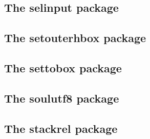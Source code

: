 \documentclass[a4paper,12pt]{article}
\makeatletter
\newcommand*{\xpackage}[1]{\textsf{#1}}
\newcommand*{\xfile}[1]{\texttt{#1}}
\newcommand*{\cs}[1]{\texttt{\textbackslash#1}}
\newcommand*{\tocinclude}[1]{%
  \setcounter{tocdepth}{3}%
  \begingroup
    \makeatletter
    \def\@prj{#1}%
    \let\contentsline\foreign@contentsline
  \endgroup
}
\def\foreign@contentsline#1#2#3#4{%
  \ifx\\#4\\%
    \csname l@#1\endcsname{#2}{#3}%
  \else
    \ifHy@linktocpage
      \csname l@#1\endcsname{{#2}}{%
        \hyper@linkfile{#3}{\@prj.pdf}{#4}%
      }%
    \else
      \csname l@#1\endcsname{%
        \hyper@linkfile{#2}{\@prj.pdf}{#4}%
      }{#3}%
    \fi
  \fi
}%
\newcommand*{\pkgsectformat}[1]{%
  \texorpdfstring{%
    \textcolor{link}{The} %
    \xpackage{#1} %
    \textcolor{link}{package}%
  }{#1}%
}
\makeatother
\begin{document}
\newpage
\subsection{\pkgsectformat{selinput}}
\label{selinput}
\begin{abstract}
This package selects the input encoding by specifying between
input characters and their glyph names.
\end{abstract}
\tocinclude{selinput}

\newpage
\subsection{\pkgsectformat{setouterhbox}}
\label{setouterhbox}
\begin{abstract}
If math stuff is set in an \cs{hbox}, then TeX
performs some optimization and omits the implicite
penalties \cs{binoppenalty} and \cs{relpenalty}.
This packages tries to put stuff into an \cs{hbox}
without getting lost of those penalties.
\end{abstract}
\tocinclude{setouterhbox}

\newpage
\subsection{\pkgsectformat{settobox}}
\label{settobox}
\begin{abstract}
Commands are defined for getting box sizes similar
to \LaTeX's \cs{settowidth} commands.
\end{abstract}
\tocinclude{settobox}

\newpage
\subsection{\pkgsectformat{soulutf8}}
\label{soulutf8}
\begin{abstract}
This package extends package \xpackage{soul} and adds some support
for UTF-8. Namely the input encodings \xfile{utf8.def}
from package \xpackage{inputenc} and
package \xpackage{ucs}'s \xfile{utf8x.def} are supported.
\end{abstract}
\tocinclude{soulutf8}

\newpage
\subsection{\pkgsectformat{stackrel}}
\label{stackrel}
\begin{abstract}
This package adds an optional argument to \cs{stackrel} for
putting something below the relational symbol and defines
\cs{stackbin} for binary symbols.
\end{abstract}
\tocinclude{stackrel}
\end{document}
